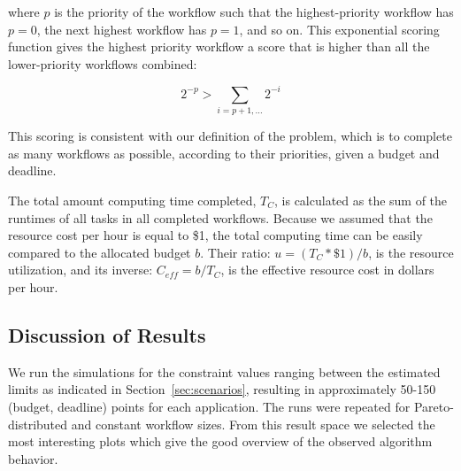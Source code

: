 \documentclass{sig-alternate}
\begin{document}
where $p$ is the priority of the workflow such that the highest-priority workflow 
has $p=0$, the next highest workflow has $p=1$, and so on. This exponential scoring 
function gives the highest priority workflow a score that is higher than all the 
lower-priority workflows combined:

\begin{equation}
\label{eq:score-property}
2^{-p} > \sum_{i=p+1,\ldots}2^{-i}
\end{equation}

This scoring is consistent with our definition of the problem, which is to 
complete as many workflows as possible, according to their priorities, given 
a budget and deadline.

The total amount computing time completed, $T_C$, is calculated as the sum 
of the runtimes of all tasks in all completed workflows. Because we assumed 
that the resource cost per hour is equal to \$1, the total computing time 
can be easily compared to the allocated budget $b$. Their ratio: 
$u = (T_C * \$1)/b$, is the resource utilization, and its inverse: 
$C_{eff} = b/T_C$, is the effective resource cost in dollars per hour.



\subsection{Discussion of Results}

We run the simulations for the constraint values ranging between the
estimated limits as indicated in Section~\ref{sec:scenarios}, resulting in
approximately 50-150 (budget, deadline) points for each application. The runs were
repeated for Pareto-distributed and constant workflow sizes. From this result
space we selected the most interesting plots which give the good overview  of
the observed algorithm behavior.
\end{document}
